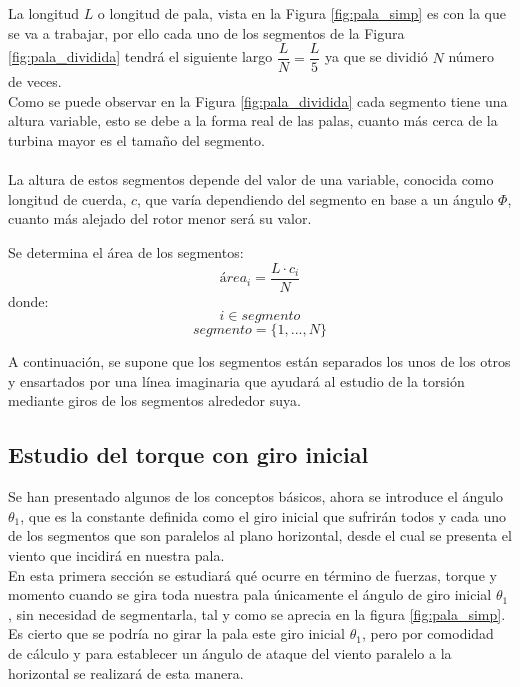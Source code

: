La longitud $L$ o longitud de pala, vista en la Figura \ref{fig:pala_simp} es con la que se va a trabajar, por ello cada uno de los segmentos de la Figura \ref{fig:pala_dividida} tendrá el siguiente largo $\dfrac{L}{N} = \dfrac{L}{5}$ ya que se dividió $N$ número de veces. \\


Como se puede observar en la Figura \ref{fig:pala_dividida} cada segmento tiene una altura variable, esto se debe a la forma real de las palas, cuanto más cerca de la turbina mayor es el tamaño del segmento. \\\\


La altura de estos segmentos depende del valor de una variable, conocida como longitud de cuerda, $c$, que varía dependiendo del segmento en base a un ángulo $\varPhi$, cuanto más alejado del rotor menor será su valor. \\


\begin{definicion}
Se determina el área de los segmentos:
$$ área_{i} = \dfrac{L \cdot c_i}{N} $$
donde:
$$ i \in segmento $$
$$ segmento = \{1, ..., N\}$$
\end{definicion}

A continuación, se supone que los segmentos están separados los unos de los otros y ensartados por una línea imaginaria que ayudará al estudio de la torsión mediante giros de los segmentos alrededor suya.

\subsection{Estudio del torque con giro inicial}

Se han presentado algunos de los conceptos básicos, ahora se introduce el ángulo $ \theta_1 $, que es la constante definida como el giro inicial que sufrirán todos y cada uno de los segmentos que son paralelos al plano horizontal, desde el cual se presenta el viento que incidirá en nuestra pala.\\

En esta primera sección se estudiará qué ocurre en término de fuerzas, torque y momento cuando se gira toda nuestra pala únicamente el ángulo de giro inicial $ \theta_1 $, sin necesidad de segmentarla, tal y como se aprecia en la figura \ref{fig:pala_simp}. \\


Es cierto que se podría no girar la pala este giro inicial $ \theta_1 $, pero por comodidad de cálculo y para establecer un ángulo de ataque del viento paralelo a la horizontal se realizará de esta manera.\\


